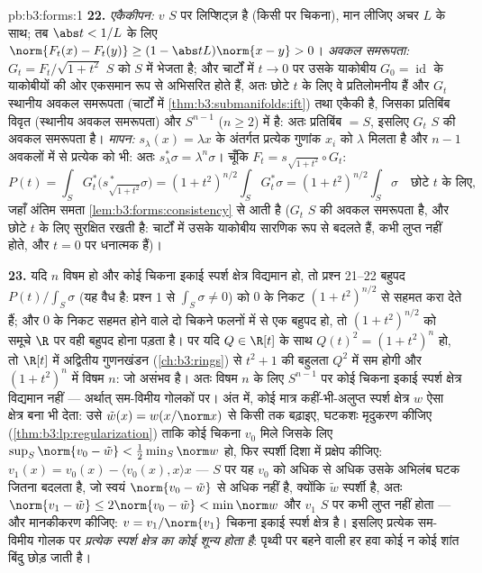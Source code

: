 \begin{solution}{pb:b3:forms:1}
\textbf{22.} \emph{एकैकीपन:} $v$ $S$ पर लिप्शिट्ज़ है (किसी
 पर चिकना), मान लीजिए अचर $L$ के साथ; तब $\abs t <
1/L$ के लिए $\norm{F_t(x) - F_t(y)} \geq (1 - \abs
tL)\norm{x - y} > 0$। \emph{अवकल समरूपता:} $G_t =
F_t/\sqrt{1 + t^2}$ $S$ को $S$ में भेजता है; और चार्टों में
$t \to 0$ पर उसके याकोबीय $G_0 = \operatorname{id}$ के
याकोबीयों की ओर एकसमान रूप से अभिसरित होते हैं, अतः छोटे $t$
के लिए वे प्रतिलोमनीय हैं और $G_t$ स्थानीय अवकल समरूपता
(चार्टों में \cref{thm:b3:submanifolds:ift}) तथा एकैकी है,
जिसका प्रतिबिंब विवृत (स्थानीय अवकल समरूपता) और
\emph{} $S^{n-1}$ ($n \geq 2$) में  है: अतः
प्रतिबिंब $= S$, इसलिए $G_t$ $S$ की अवकल समरूपता है।
\emph{मापन:} $s_\lambda(x) = \lambda x$ के अंतर्गत प्रत्येक
गुणांक $x_i$ को $\lambda$ मिलता है और $n - 1$ अवकलों में से
प्रत्येक को भी: अतः $s_\lambda^*\sigma =
\lambda^n\sigma$। चूँकि $F_t = s_{\sqrt{1+t^2}}\circ G_t$:
\[
P(t) = \int_SG_t^*\bigl(s_{\sqrt{1+t^2}}^{\,*}\sigma\bigr)
= (1 + t^2)^{n/2}\int_SG_t^*\sigma
= (1 + t^2)^{n/2}\int_S\sigma
\quad\text{छोटे } t \text{ के लिए},
\]
जहाँ अंतिम समता \cref{lem:b3:forms:consistency} से आती है
($G_t$ $S$ की अवकल समरूपता है, और छोटे $t$ के लिए
 सुरक्षित रखती है: चार्टों में उसके याकोबीय सारणिक
 रूप से बदलते हैं, कभी लुप्त नहीं होते, और $t = 0$ पर
धनात्मक हैं)।

\textbf{23.} यदि $n$ विषम हो और कोई चिकना इकाई स्पर्श क्षेत्र
विद्यमान हो, तो प्रश्न 21--22 बहुपद $P(t)/\int_S\sigma$
(यह वैध है: प्रश्न 1 से $\int_S\sigma \neq 0$) को $0$ के निकट
$(1 + t^2)^{n/2}$ से सहमत करा देते हैं; और $0$ के निकट सहमत
होने वाले दो चिकने फलनों में से एक बहुपद हो, तो
$(1 + t^2)^{n/2}$ को समूचे $\R$ पर वही बहुपद होना पड़ता है।
पर यदि $Q \in \R[t]$ के साथ $Q(t)^2 = (1 + t^2)^n$ हो, तो
$\R[t]$ में अद्वितीय गुणनखंडन
(\cref{ch:b3:rings}) से  $t^2 + 1$ की बहुलता $Q^2$ में
सम होगी और $(1 + t^2)^n$ में विषम $n$: जो असंभव है। अतः
विषम $n$ के लिए $S^{n-1}$ पर कोई चिकना इकाई स्पर्श क्षेत्र
विद्यमान नहीं --- अर्थात् सम-विमीय गोलकों पर। अंत में, कोई
मात्र  कहीं-भी-अलुप्त स्पर्श क्षेत्र $w$ ऐसा क्षेत्र बना
भी देता: उसे $\tilde w(x) = w(x/\norm x)$ से किसी 
तक बढ़ाइए, घटकशः मृदुकरण कीजिए
(\cref{thm:b3:lp:regularization}) ताकि कोई चिकना
$v_0$ मिले जिसके लिए $\sup_S\norm{v_0 - \tilde w} <
\frac12\min_S\norm w$ हो, फिर स्पर्शी दिशा में प्रक्षेप
कीजिए: $v_1(x) = v_0(x)
- \langle v_0(x), x\rangle x$ --- $S$ पर यह $v_0$ को अधिक से
अधिक उसके अभिलंब घटक जितना बदलता है, जो स्वयं
$\norm{v_0 - \tilde w}$ से अधिक नहीं है, क्योंकि $\tilde w$
स्पर्शी है, अतः $\norm{v_1 - \tilde
w} \leq 2\norm{v_0 - \tilde w} < \min\norm w$ और $v_1$ $S$
पर कभी लुप्त नहीं होता --- और मानकीकरण कीजिए: $v =
v_1/\norm{v_1}$ चिकना इकाई स्पर्श क्षेत्र है। इसलिए प्रत्येक
सम-विमीय गोलक पर \emph{प्रत्येक  स्पर्श क्षेत्र का कोई
शून्य होता है}: पृथ्वी पर बहने वाली हर हवा कोई न कोई शांत
बिंदु छोड़ जाती है।


\end{solution}
